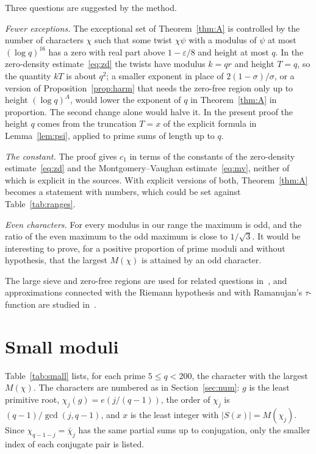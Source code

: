 \documentclass[11pt,a4paper,reqno]{amsart}
\theoremstyle{remark}
\numberwithin{equation}{section}
\newcommand{\eps}{\varepsilon}
\begin{document}
Three questions are suggested by the method.

\emph{Fewer exceptions.} The exceptional set of Theorem~\ref{thm:A} is controlled by the number of characters $\chi$ such that some twist $\chi\psi$ with a modulus of $\psi$ at most $(\log q)^{16}$ has a zero with real part above $1-\eps/8$ and height at most $q$. In the zero-density estimate~\eqref{eq:zd} the twists have modulus $k=qr$ and height $T=q$, so the quantity $kT$ is about $q^2$; a smaller exponent in place of $2(1-\sigma)/\sigma$, or a version of Proposition~\ref{prop:harm} that needs the zero-free region only up to height $(\log q)^{A}$, would lower the exponent of $q$ in Theorem~\ref{thm:A} in proportion. The second change alone would halve it. In the present proof the height $q$ comes from the truncation $T=x$ of the explicit formula in Lemma~\ref{lem:psi}, applied to prime sums of length up to $q$.

\emph{The constant.} The proof gives $c_1$ in terms of the constants of the zero-density estimate~\eqref{eq:zd} and the Montgomery--Vaughan estimate~\eqref{eq:mv}, neither of which is explicit in the sources. With explicit versions of both, Theorem~\ref{thm:A} becomes a statement with numbers, which could be set against Table~\ref{tab:ranges}.

\emph{Even characters.} For every modulus in our range the maximum is odd, and the ratio of the even maximum to the odd maximum is close to $1/\sqrt3$. It would be interesting to prove, for a positive proportion of prime moduli and without hypothesis, that the largest $M(\chi)$ is attained by an odd character.

The large sieve and zero-free regions are used for related questions in~\cite{Bha26b,Bha26c}, and approximations connected with the Riemann hypothesis and with Ramanujan's $\tau$-function are studied in~\cite{Bha26a,Bha23}.
\appendix
\section{Small moduli}\label{app:small}
Table~\ref{tab:small} lists, for each prime $5\le q<200$, the character with the largest $M(\chi)$. The characters are numbered as in Section~\ref{sec:num}: $g$ is the least primitive root, $\chi_j(g)=e(j/(q-1))$, the order of $\chi_j$ is $(q-1)/\gcd(j,q-1)$, and $x$ is the least integer with $|S(x)|=M(\chi_j)$. Since $\chi_{q-1-j}=\bar\chi_j$ has the same partial sums up to conjugation, only the smaller index of each conjugate pair is listed.
\end{document}
